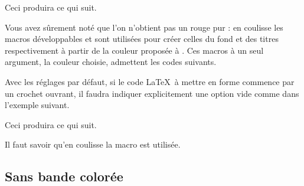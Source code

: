 

\begin{tdocexa}
    \leavevmode


    Ceci produira ce qui suit.

    \medskip

    
\end{tdocexa}


\begin{tdocnote}
    Vous avez sûrement noté que l'on n'obtient pas un rouge pur : en coulisse les macros développables  et  sont utilisées pour créer celles du fond et des titres respectivement à partir de la couleur proposée à .
    Ces macros à un seul argument, la couleur choisie, admettent les codes suivants.

    \begin{tdoclatex}[code]
    \end{tdoclatex}
\end{tdocnote}




\begin{tdocwarn}
    Avec les réglages par défaut, si le code \LaTeX\ à mettre en forme commence par un crochet ouvrant, il faudra indiquer explicitement une option vide comme dans l'exemple suivant.


    Ceci produira ce qui suit.

    \medskip

    
\end{tdocwarn}


\begin{tdocnote}
    Il faut savoir qu'en coulisse la macro  est utilisée.

    \begin{tdoclatex}[std]
    \end{tdoclatex}
\end{tdocnote}


\subsection{Sans bande colorée}

